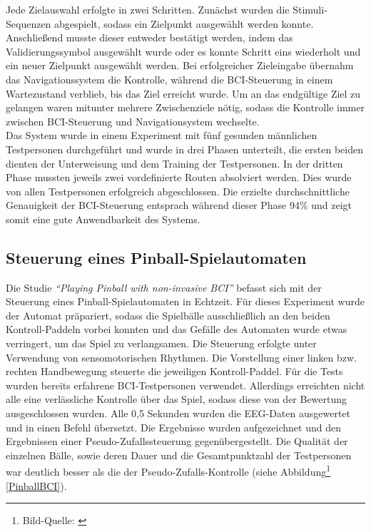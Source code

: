 \pagebreak
Jede Zielauswahl erfolgte in zwei Schritten. Zunächst wurden die Stimuli-Sequenzen abgespielt, sodass ein Zielpunkt ausgewählt werden konnte.
Anschließend musste dieser entweder bestätigt werden, indem das Validierungssymbol ausgewählt wurde 
oder es konnte Schritt eins wiederholt und ein neuer Zielpunkt ausgewählt werden.
Bei erfolgreicher Zieleingabe übernahm das Navigationssystem die Kontrolle, während die BCI-Steuerung in einem Wartezustand verblieb, bis das Ziel erreicht wurde.
Um an das endgültige Ziel zu gelangen waren mitunter mehrere Zwischenziele nötig, sodass die Kontrolle immer zwischen BCI-Steuerung und Navigationsystem wechselte.\\

Das System wurde in einem Experiment mit fünf gesunden männlichen Testpersonen durchgeführt und wurde in drei Phasen unterteilt, die ersten beiden dienten der Unterweisung und dem Training der Testpersonen. 
In der dritten Phase mussten jeweils zwei vordefinierte Routen absolviert werden. 
Dies wurde von allen Testpersonen erfolgreich abgeschlossen.
Die erzielte durchschnittliche Genauigkeit der BCI-Steuerung entsprach während dieser Phase 94\% und zeigt somit eine gute Anwendbarkeit des Systems.\\










\pagebreak
\subsection{Steuerung eines Pinball-Spielautomaten}
\vspace{0.3cm}

Die Studie \textit{"`Playing Pinball with non-invasive BCI"'} \cite{BCIPinball} befasst sich mit der Steuerung eines Pinball-Spielautomaten in Echtzeit.
Für dieses Experiment wurde der Automat präpariert, sodass die Spielbälle ausschließlich an den beiden Kontroll-Paddeln vorbei konnten 
und das Gefälle des Automaten wurde etwas verringert, um das Spiel zu verlangsamen.
Die Steuerung erfolgte unter Verwendung von sensomotorischen Rhythmen. Die Vorstellung einer linken bzw. rechten Handbewegung steuerte die jeweiligen Kontroll-Paddel.
Für die Tests wurden bereits erfahrene BCI-Testpersonen verwendet. Allerdings erreichten nicht alle eine verlässliche Kontrolle über das Spiel, sodass diese von der Bewertung ausgeschlossen wurden.
Alle 0,5 Sekunden wurden die EEG-Daten ausgewertet und in einen Befehl übersetzt. Die Ergebnisse wurden aufgezeichnet und den Ergebnissen einer Pseudo-Zufallssteuerung gegenübergestellt.
Die Qualität der einzelnen Bälle, 
sowie deren Dauer und die Gesamtpunktzahl der Testpersonen war deutlich besser als die der Pseudo-Zufalls-Kontrolle (siehe Abbildung\footnote[1]{Bild-Quelle: \cite[S.7]{BCIPinball}} \ref{PinballBCI}).\\

